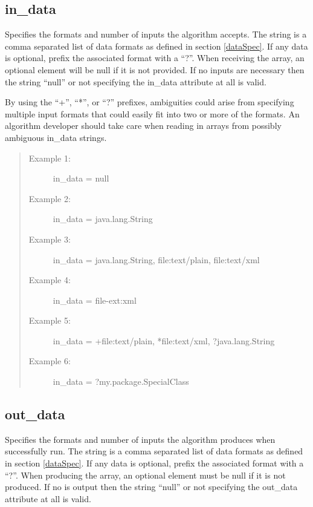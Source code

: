 \subsection*{in\_data} 
Specifies the formats and number of  inputs the
algorithm accepts. The string is a comma separated list of data formats as
defined in section \ref{dataSpec}. If any data is optional, prefix the associated
format with a ``?''. When receiving the  array, an optional
 element will be null if it is not provided. If no 
inputs are necessary then the string ``null'' or not specifying the in\_data attribute
at all is valid.

By using the ``+'', ``*'', or ``?'' prefixes, ambiguities could arise from
specifying multiple input formats that could easily fit into two or more
of the formats. An algorithm developer should take care when reading
in  arrays from possibly ambiguous in\_data strings.

\begin{quote}
\begin{description}
  \item[Example 1:] in\_data = null
  \item[Example 2:] in\_data = java.lang.String
  \item[Example 3:] in\_data = java.lang.String, file:text/plain, file:text/xml
  \item[Example 4:] in\_data = file-ext:xml
  \item[Example 5:] in\_data = +file:text/plain, *file:text/xml,
  ?java.lang.String
  \item[Example 6:] in\_data = ?my.package.SpecialClass
\end{description}
\end{quote}


\subsection*{out\_data} 
Specifies the formats and number of  inputs
the algorithm produces when successfully run. The string is a comma separated
list of data formats as defined in section \ref{dataSpec}. If any data is
optional, prefix the associated format with a ``?''. When producing the
 array, an optional  element must be null if it is not
produced. If no  is output then the string ``null'' or not specifying
the out\_data attribute at all is valid.

